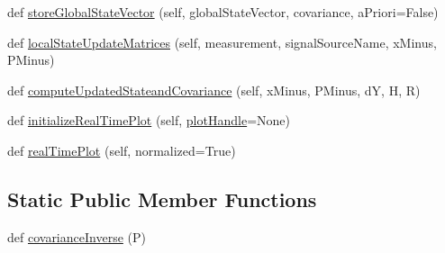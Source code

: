 \begin{DoxyCompactItemize}
\item 
def \hyperlink{classmodest_1_1modularfilter_1_1ModularFilter_a15412a15695827fc57a0609000a1c9c0}{store\+Global\+State\+Vector} (self, global\+State\+Vector, covariance, a\+Priori=False)
\item 
def \hyperlink{classmodest_1_1modularfilter_1_1ModularFilter_ab1dc914f4939e1219f4f2d0efbafd9dd}{local\+State\+Update\+Matrices} (self, measurement, signal\+Source\+Name, x\+Minus, P\+Minus)
\item 
def \hyperlink{classmodest_1_1modularfilter_1_1ModularFilter_ada608a31a2fb8bee8965042c134ead47}{compute\+Updated\+Stateand\+Covariance} (self, x\+Minus, P\+Minus, dY, H, R)
\item 
def \hyperlink{classmodest_1_1modularfilter_1_1ModularFilter_aafbb97419cd23cddddf96d61e577b584}{initialize\+Real\+Time\+Plot} (self, \hyperlink{classmodest_1_1modularfilter_1_1ModularFilter_a2945291a2115aba2680a7c1a1cf728fc}{plot\+Handle}=None)
\item 
def \hyperlink{classmodest_1_1modularfilter_1_1ModularFilter_a028d2750278a922bb89e895b53112452}{real\+Time\+Plot} (self, normalized=True)
\end{DoxyCompactItemize}
\subsection*{Static Public Member Functions}
\begin{DoxyCompactItemize}
\item 
def \hyperlink{classmodest_1_1modularfilter_1_1ModularFilter_a23cedf0034dc1878c7c7ff2d970640d8}{covariance\+Inverse} (P)
\end{DoxyCompactItemize}
